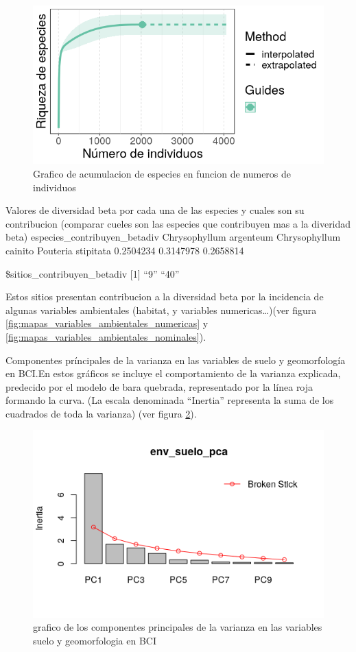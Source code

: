 \documentclass[11pt,]{article}
\begin{document}
\begin{figure}
\centering
\includegraphics{acumulacion_especies_individuos.png}
\caption{Grafico de acumulacion de especies en funcion de numeros de
individuos \label{fig:acumulacion_especies_individuos}}
\end{figure}

Valores de diversidad beta por cada una de las especies y cuales son su
contribucion (comparar cueles son las especies que contribuyen mas a la
diveridad beta) especies\_contribuyen\_betadiv Chrysophyllum argenteum
Chrysophyllum cainito Pouteria stipitata 0.2504234 0.3147978 0.2658814

\$sitios\_contribuyen\_betadiv {[}1{]} ``9'' ``40''

Estos sitios presentan contribucion a la diversidad beta por la
incidencia de algunas variables ambientales (habitat, y variables
numericas\ldots{})(ver figura
\ref{fig:mapas_variables_ambientales_numericas} y
\ref{fig:mapas_variables_ambientales_nominales}).

Componentes príncipales de la varianza en las variables de suelo y
geomorfología en BCI.En estos gráficos se incluye el comportamiento de
la varianza explicada, predecido por el modelo de bara quebrada,
representado por la línea roja formando la curva. (La escala denominada
``Inertia'' representa la suma de los cuadrados de toda la varianza)
(ver figura \ref{fig:env_suelo_pca}).

\begin{figure}
\centering
\includegraphics{env_suelo_pca.png}
\caption{grafico de los componentes principales de la varianza en las
variables suelo y geomorfologia en BCI \label{fig:env_suelo_pca}}
\end{figure}
\end{document}
